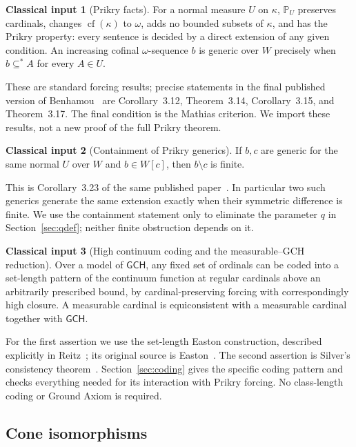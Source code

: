 \documentclass[11pt,letterpaper]{article}
\theoremstyle{definition}
\newtheorem{inputthm}{Classical input}
\numberwithin{equation}{section}
\newcommand{\GCH}{\mathsf{GCH}}
\newcommand{\PP}{\mathbb P}
\newcommand{\cf}{\operatorname{cf}}
\begin{document}
\begin{inputthm}[Prikry facts]\label{input:prikry}
For a normal measure $U$ on $\kappa$, $\PP_U$ preserves cardinals, changes $\cf(\kappa)$ to $\omega$, adds no bounded subsets of $\kappa$, and has the Prikry property: every sentence is decided by a direct extension of any given condition. An increasing cofinal $\omega$-sequence $b$ is generic over $W$ precisely when $b\subseteq^* A$ for every $A\in U$.
\end{inputthm}

These are standard forcing results; precise statements in the final published version of Benhamou~\cite{benhamou} are Corollary~3.12, Theorem~3.14, Corollary~3.15, and Theorem~3.17. The final condition is the Mathias criterion. We import these results, not a new proof of the full Prikry theorem.

\begin{inputthm}[Containment of Prikry generics]\label{input:containment}
If $b,c$ are generic for the same normal $U$ over $W$ and $b\in W[c]$, then $b\setminus c$ is finite.
\end{inputthm}

This is Corollary~3.23 of the same published paper~\cite{benhamou}. In particular two such generics generate the same extension exactly when their symmetric difference is finite. We use the containment statement only to eliminate the parameter $q$ in Section~\ref{sec:qdef}; neither finite obstruction depends on it.

\begin{inputthm}[High continuum coding and the measurable--GCH reduction]\label{input:coding}
Over a model of $\GCH$, any fixed set of ordinals can be coded into a set-length pattern of the continuum function at regular cardinals above an arbitrarily prescribed bound, by cardinal-preserving forcing with correspondingly high closure. A measurable cardinal is equiconsistent with a measurable cardinal together with $\GCH$.
\end{inputthm}

For the first assertion we use the set-length Easton construction, described explicitly in Reitz~\cite[Section~3]{reitz}; its original source is Easton~\cite{easton}. The second assertion is Silver's consistency theorem~\cite{silver}. Section~\ref{sec:coding} gives the specific coding pattern and checks everything needed for its interaction with Prikry forcing. No class-length coding or Ground Axiom is required.

\subsection{Cone isomorphisms}
\end{document}
